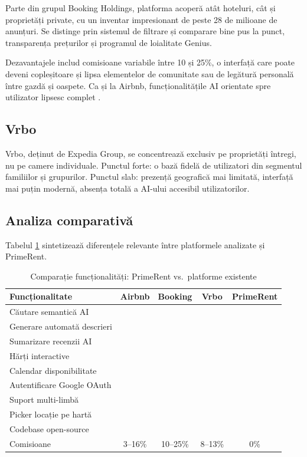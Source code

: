 \documentclass[12pt,a4paper,oneside]{report}
\newcommand{\cmark}{\ding{51}}
\newcommand{\xmark}{\ding{55}}
\begin{document}
Parte din grupul Booking Holdings, platforma acoperă atât hoteluri, cât și proprietăți private, cu un inventar impresionant de peste 28 de milioane de anunțuri. Se distinge prin sistemul de filtrare și comparare bine pus la punct, transparența prețurilor și programul de loialitate Genius.

Dezavantajele includ comisioane variabile între 10 și 25\%, o interfață care poate deveni copleșitoare și lipsa elementelor de comunitate sau de legătură personală între gazdă și oaspete. Ca și la Airbnb, funcționalitățile AI orientate spre utilizator lipsesc complet \cite{booking}.

\subsection{Vrbo}

Vrbo, deținut de Expedia Group, se concentrează exclusiv pe proprietăți întregi, nu pe camere individuale. Punctul forte: o bază fidelă de utilizatori din segmentul familiilor și grupurilor. Punctul slab: prezență geografică mai limitată, interfață mai puțin modernă, absența totală a AI-ului accesibil utilizatorilor.

\subsection{Analiza comparativă}

Tabelul \ref{tab:comparatie} sintetizează diferențele relevante între platformele analizate și PrimeRent.

\begin{table}[H]
\centering
\caption{Comparație funcționalități: PrimeRent vs.\ platforme existente}
\label{tab:comparatie}
\small
\begin{tabular}{l c c c c}
\toprule
\textbf{Funcționalitate} & \textbf{Airbnb} & \textbf{Booking} & \textbf{Vrbo} & \textbf{PrimeRent} \\
\midrule
Căutare semantică AI         & \xmark & \xmark & \xmark & \cmark \\
Generare automată descrieri   & \xmark & \xmark & \xmark & \cmark \\
Sumarizare recenzii AI        & \xmark & \xmark & \xmark & \cmark \\
Hărți interactive             & \cmark & \cmark & \cmark & \cmark \\
Calendar disponibilitate      & \cmark & \cmark & \cmark & \cmark \\
Autentificare Google OAuth    & \cmark & \xmark & \xmark & \cmark \\
Suport multi-limbă            & \cmark & \cmark & \cmark & \cmark \\
Picker locație pe hartă       & \xmark & \xmark & \xmark & \cmark \\
Codebase open-source          & \xmark & \xmark & \xmark & \cmark \\
Comisioane                    & 3--16\% & 10--25\% & 8--13\% & 0\% \\
\bottomrule
\end{tabular}
\end{table}
\end{document}

